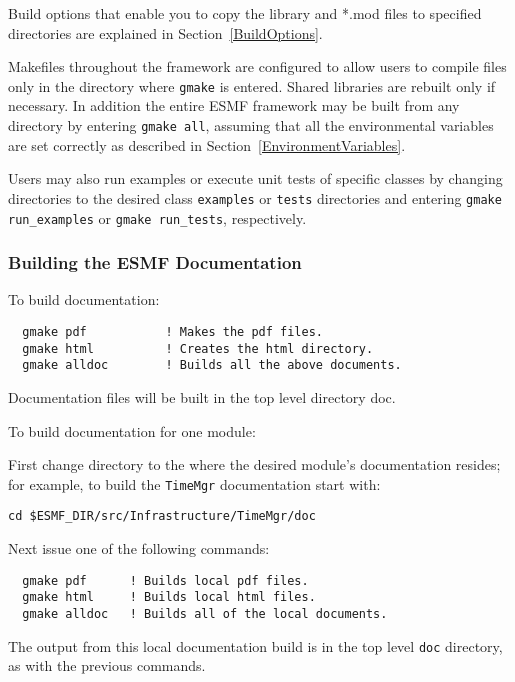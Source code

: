 Build options that enable you to copy the library and *.mod files to
specified directories are explained in Section~\ref{BuildOptions}. 

Makefiles throughout the framework are configured to allow users to
compile files only in the directory where {\tt gmake} is entered. Shared
libraries are rebuilt only if necessary. In addition the entire ESMF
framework may be built from any directory by entering {\tt gmake all},
assuming that all the environmental variables are set correctly as
described in Section~\ref{EnvironmentVariables}.

Users may also run examples or execute unit tests of specific classes
by changing directories to the desired class {\tt examples} or {\tt tests} 
directories and entering {\tt gmake run\_examples} or 
{\tt gmake run\_tests}, respectively.

\subsubsection{Building the ESMF Documentation}
\label{BuildDocumentation}

\noindent To build documentation:
\begin{verbatim}
  gmake pdf           ! Makes the pdf files.
  gmake html          ! Creates the html directory.
  gmake alldoc        ! Builds all the above documents.
\end{verbatim}

\noindent Documentation files will be built in the top level directory doc.

\noindent To build documentation for one module:

\noindent First change directory to the where the desired module's documentation 
resides; for example, to build the {\tt TimeMgr} documentation start
with:

\begin{verbatim}
cd $ESMF_DIR/src/Infrastructure/TimeMgr/doc
\end{verbatim}

\noindent Next issue one of the following commands:
\begin{verbatim}
  gmake pdf      ! Builds local pdf files.
  gmake html     ! Builds local html files.
  gmake alldoc   ! Builds all of the local documents.
\end{verbatim}

\noindent The output from this local documentation build is in the top 
level {\tt doc} directory, as with the previous commands.






